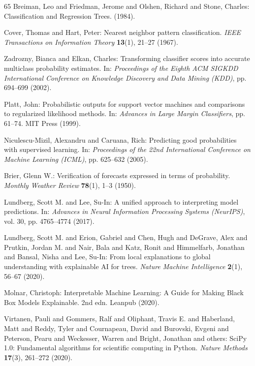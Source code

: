 \documentclass[pdflatex,sn-mathphys-num]{sn-jnl}%
\theoremstyle{thmstyleone}%
\theoremstyle{thmstyletwo}%
\theoremstyle{thmstylethree}%
\begin{document}
\begin{thebibliography}{65}
Breiman, Leo and Friedman, Jerome and Olshen, Richard and Stone, Charles: Classification and Regression Trees.
\textit{} (1984).

Cover, Thomas and Hart, Peter: Nearest neighbor pattern classification.
\textit{IEEE Transactions on Information Theory} \textbf{13}(1), 21--27 (1967).

Zadrozny, Bianca and Elkan, Charles: Transforming classifier scores into accurate multiclass probability estimates.
In: \textit{Proceedings of the Eighth ACM SIGKDD International Conference on Knowledge Discovery and Data Mining (KDD)}, pp. 694--699 (2002).

Platt, John: Probabilistic outputs for support vector machines and comparisons to regularized likelihood methods.
In: \textit{Advances in Large Margin Classifiers}, pp. 61--74. MIT Press (1999).

Niculescu-Mizil, Alexandru and Caruana, Rich: Predicting good probabilities with supervised learning.
In: \textit{Proceedings of the 22nd International Conference on Machine Learning (ICML)}, pp. 625--632 (2005).

Brier, Glenn W.: Verification of forecasts expressed in terms of probability.
\textit{Monthly Weather Review} \textbf{78}(1), 1--3 (1950).

Lundberg, Scott M. and Lee, Su-In: A unified approach to interpreting model predictions.
In: \textit{Advances in Neural Information Processing Systems (NeurIPS)}, vol. 30, pp. 4765--4774 (2017).

Lundberg, Scott M. and Erion, Gabriel and Chen, Hugh and DeGrave, Alex and Prutkin, Jordan M. and Nair, Bala and Katz, Ronit and Himmelfarb, Jonathan and Bansal, Nisha and Lee, Su-In: From local explanations to global understanding with explainable AI for trees.
\textit{Nature Machine Intelligence} \textbf{2}(1), 56--67 (2020).

Molnar, Christoph: Interpretable Machine Learning: A Guide for Making Black Box Models Explainable.
2nd edn. Leanpub (2020).

Virtanen, Pauli and Gommers, Ralf and Oliphant, Travis E. and Haberland, Matt and Reddy, Tyler and Cournapeau, David and Burovski, Evgeni and Peterson, Pearu and Weckesser, Warren and Bright, Jonathan and others: SciPy 1.0: Fundamental algorithms for scientific computing in Python.
\textit{Nature Methods} \textbf{17}(3), 261--272 (2020).


\end{thebibliography}
\end{document}
